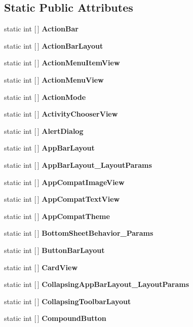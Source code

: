 \subsection*{Static Public Attributes}
\begin{DoxyCompactItemize}
\item 
static int \mbox{[}$\,$\mbox{]} {\bfseries Action\+Bar}
\item 
static int \mbox{[}$\,$\mbox{]} {\bfseries Action\+Bar\+Layout}
\item 
static int \mbox{[}$\,$\mbox{]} {\bfseries Action\+Menu\+Item\+View}
\item 
\mbox{\label{classXaria_1_1Resource_1_1Styleable_a5c413358322a1838ce51a0c3378073fd}} 
static int \mbox{[}$\,$\mbox{]} {\bfseries Action\+Menu\+View}
\item 
static int \mbox{[}$\,$\mbox{]} {\bfseries Action\+Mode}
\item 
static int \mbox{[}$\,$\mbox{]} {\bfseries Activity\+Chooser\+View}
\item 
static int \mbox{[}$\,$\mbox{]} {\bfseries Alert\+Dialog}
\item 
static int \mbox{[}$\,$\mbox{]} {\bfseries App\+Bar\+Layout}
\item 
static int \mbox{[}$\,$\mbox{]} {\bfseries App\+Bar\+Layout\+\_\+\+Layout\+Params}
\item 
static int \mbox{[}$\,$\mbox{]} {\bfseries App\+Compat\+Image\+View}
\item 
static int \mbox{[}$\,$\mbox{]} {\bfseries App\+Compat\+Text\+View}
\item 
\mbox{\label{classXaria_1_1Resource_1_1Styleable_a94976c07f4bebfe24171aa554646ba11}} 
static int \mbox{[}$\,$\mbox{]} {\bfseries App\+Compat\+Theme}
\item 
static int \mbox{[}$\,$\mbox{]} {\bfseries Bottom\+Sheet\+Behavior\+\_\+\+Params}
\item 
static int \mbox{[}$\,$\mbox{]} {\bfseries Button\+Bar\+Layout}
\item 
static int \mbox{[}$\,$\mbox{]} {\bfseries Card\+View}
\item 
static int \mbox{[}$\,$\mbox{]} {\bfseries Collapsing\+App\+Bar\+Layout\+\_\+\+Layout\+Params}
\item 
static int \mbox{[}$\,$\mbox{]} {\bfseries Collapsing\+Toolbar\+Layout}
\item 
static int \mbox{[}$\,$\mbox{]} {\bfseries Compound\+Button}

\end{DoxyCompactItemize}
